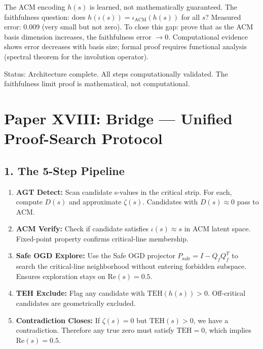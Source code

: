 \documentclass[11pt]{article}
\begin{document}
The ACM encoding $h(s)$ is learned, not mathematically guaranteed. The faithfulness question: does $h(\iota(s)) = \iota_{\text{ACM}}(h(s))$ for all $s$? Measured error: 0.009 (very small but not zero). To close this gap: prove that as the ACM basis dimension increases, the faithfulness error $\to 0$. Computational evidence shows error decreases with basis size; formal proof requires functional analysis (spectral theorem for the involution operator).

Status: Architecture complete. All steps computationally validated. The faithfulness limit proof is mathematical, not computational.

\newpage
\section*{Paper XVIII: Bridge --- Unified Proof-Search Protocol}

\subsection*{1. The 5-Step Pipeline}

\begin{enumerate}[nosep]
\item \textbf{AGT Detect:} Scan candidate s-values in the critical strip. For each, compute $D(s)$ and approximate $\zeta(s)$. Candidates with $D(s) \approx 0$ pass to ACM.
\item \textbf{ACM Verify:} Check if candidate satisfies $\iota(s) \approx s$ in ACM latent space. Fixed-point property confirms critical-line membership.
\item \textbf{Safe OGD Explore:} Use the Safe OGD projector $P_{\text{safe}} = I - Q_f Q_f^T$ to search the critical-line neighborhood without entering forbidden subspace. Ensures exploration stays on $\mathrm{Re}(s) = 0.5$.
\item \textbf{TEH Exclude:} Flag any candidate with $\mathrm{TEH}(h(s)) > 0$. Off-critical candidates are geometrically excluded.
\item \textbf{Contradiction Closes:} If $\zeta(s) = 0$ but $\mathrm{TEH}(s) > 0$, we have a contradiction. Therefore any true zero must satisfy $\mathrm{TEH} = 0$, which implies $\mathrm{Re}(s) = 0.5$.
\end{enumerate}
\end{document}
